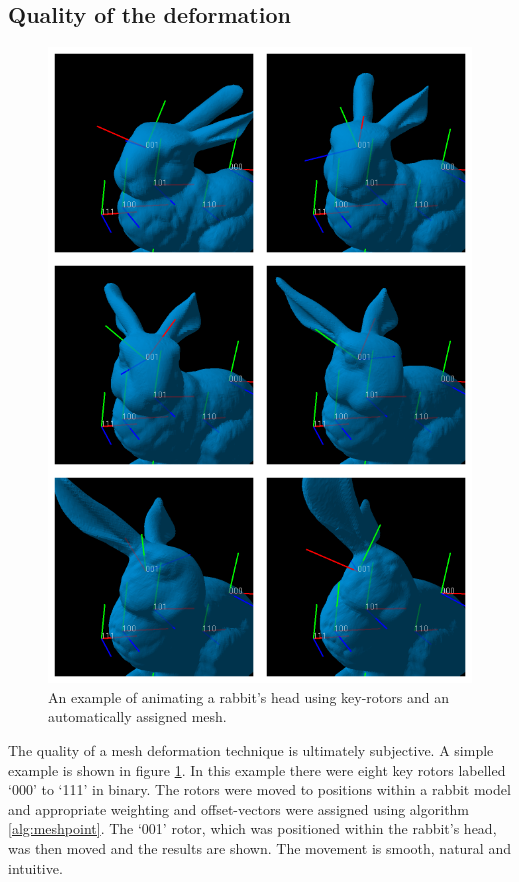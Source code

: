 \subsection{Quality of the deformation}

\begin{figure}[p]
\centering
\includegraphics[height=0.8\textheight]{mesh_example}
\caption{\label{fig:meshexample}An example of animating a rabbit's head using key-rotors and an automatically
  assigned mesh.}
\end{figure}

The quality of a mesh deformation technique is ultimately subjective. A simple
example is shown in figure \ref{fig:meshexample}. In this example there were
eight key rotors labelled `000' to `111' in binary. The rotors were moved to
positions within a rabbit model and appropriate weighting and offset-vectors
were assigned using algorithm \ref{alg:meshpoint}. The `001' rotor, which was
positioned within the rabbit's head, was then moved and the results are shown.
The movement is smooth, natural and intuitive.


